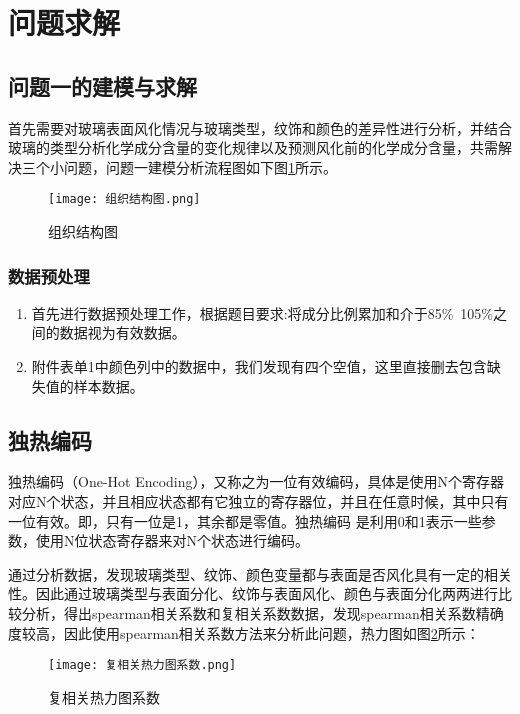 \section{问题求解}

\subsection{问题一的建模与求解}
首先需要对玻璃表面风化情况与玻璃类型，纹饰和颜色的差异性进行分析，并结合玻璃的类型分析化学成分含量的变化规律以及预测风化前的化学成分含量，共需解决三个小问题，问题一建模分析流程图如下图\ref{p-1}所示。
\begin{figure}[!htbp]
	\centering
	\texttt{[image: 组织结构图.png]}
	\setlength{\abovecaptionskip}{3pt}%
	\caption{组织结构图}
	\label{p-1}
\end{figure}

\subsubsection{数据预处理}
\begin{enumerate}
	\item 首先进行数据预处理工作，根据题目要求:将成分比例累加和介于85\%~105\%之间的数据视为有效数据。
	\item 附件表单1中颜色列中的数据中，我们发现有四个空值，这里直接删去包含缺失值的样本数据。	
\end{enumerate}

\subsection{独热编码}
独热编码（One-Hot Encoding），又称之为一位有效编码，具体是使用N个寄存器对应N个状态，并且相应状态都有它独立的寄存器位，并且在任意时候，其中只有一位有效。即，只有一位是1，其余都是零值。独热编码 是利用0和1表示一些参数，使用N位状态寄存器来对N个状态进行编码。

通过分析数据，发现玻璃类型、纹饰、颜色变量都与表面是否风化具有一定的相关性。因此通过玻璃类型与表面分化、纹饰与表面风化、颜色与表面分化两两进行比较分析，得出spearman相关系数和复相关系数数据，发现spearman相关系数精确度较高，因此使用spearman相关系数方法来分析此问题，热力图如图\ref{p-16}所示：
\begin{figure}[!htbp]
	\centering
	\texttt{[image: 复相关热力图系数.png]}
	\setlength{\abovecaptionskip}{3pt}%
	\caption{复相关热力图系数}
	\label{p-16}
\end{figure}


